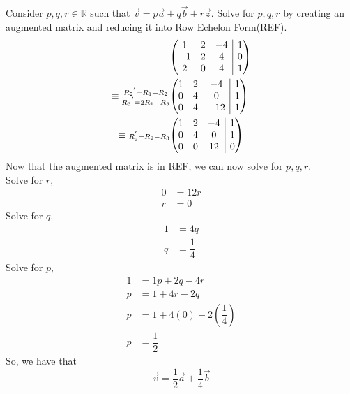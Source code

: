 \documentclass[12pt]{book}
\makeatletter
\newenvironment{amatrix}[1]{%
  \left(\begin{array}{@{}*{#1}{c}|c@{}}
}{%
  \end{array}\right)
}
\makeatother
\begin{document}
\begin{enumerate}
Consider $p,q,r \in \mathbb{R}$ such that $\vec{v} = p\vec{a}+q\vec{b}+r\vec{z}$. Solve for $p,q,r$ by creating an augmented matrix and reducing it into Row Echelon Form(REF). \\
\begingroup
\addtolength{\jot}{0.5em}
\begin{align}
    &\begin{amatrix}{3}
       1 & 2 & -4 & 1 \\
       -1 & 2 & 4 & 0 \\
       2 & 0 & 4 & 1 
    \end{amatrix}\\
    \equiv
    \substack{{R_2}^{'} = R_1+R_2 \\
    {R_3}^{'} = 2R_1-R_3}
    &\begin{amatrix}{3}
       1 & 2 & -4 & 1 \\
       0 & 4 & 0 & 1 \\
       0 & 4 & -12 & 1 
    \end{amatrix}\\
    \equiv
    \substack{ \\
    R_3^{'} = R_2-R_3}
    &\begin{amatrix}{3}
       1 & 2 & -4 & 1 \\
       0 & 4 & 0 & 1 \\
       0 & 0 & 12 & 0 
    \end{amatrix}
\end{align}
\endgroup
Now that the augmented matrix is in REF, we can now solve for $p,q,r$.\\
Solve for $r$,
\begin{align}
    0 &= 12 r \\
    r &= 0
\end{align}
Solve for $q$,
\begin{align}
    1 &= 4q \\
    q &= \dfrac{1}{4}
\end{align}
Solve for $p$,
\begin{align}
    1 &= 1p+2q-4r \\
    p &= 1+4r-2q \\
    p &= 1+4(0)-2\left(\dfrac{1}{4}\right) \\
    p &= \dfrac{1}{2}
\end{align}
So, we have that
$$\vec{v} = \dfrac{1}{2}\vec{a} + \dfrac{1}{4}\vec{b}$$


\end{enumerate}
\end{document}
